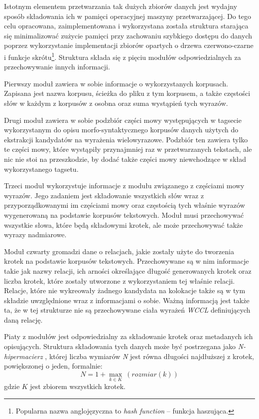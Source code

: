 \documentclass[11pt,a4paper]{llncs}
\begin{document}
Istotnym elementem przetwarzania tak dużych zbiorów danych jest wydajny sposób składowania ich w pamięci operacyjnej maszyny przetwarzającej.
Do tego celu opracowana, zaimplementowana i wykorzystana została struktura starająca się minimalizować zużycie pamięci przy zachowaniu szybkiego dostępu do danych poprzez wykorzystanie implementacji zbiorów opartych o drzewa czerwono-czarne i funkcje skrótu\footnote{Popularna nazwa anglojęzyczna to \emph{hash function} -- funkcja haszująca.}.
Struktura składa się z pięciu modułów odpowiedzialnych za przechowywanie innych informacji.


Pierwszy moduł zawiera w sobie informacje o wykorzystanych korpusach.
Zapisana jest nazwa korpusu, ścieżka do pliku z tym korpusem, a także częstości słów w każdym z korpusów z osobna oraz suma wystąpień tych wyrazów.


Drugi  moduł zawiera w sobie podzbiór części mowy występujących w tagsecie wykorzystanym do opisu morfo-syntaktycznego korpusów danych użytych do ekstrakcji kandydatów na wyrażenia wielowyrazowe.
Podzbiór ten zawiera tylko te części mowy, które wystąpiły przynajmniej raz w przetwarzanych tekstach, ale nic nie stoi na przeszkodzie, by dodać także części mowy niewchodzące w skład wykorzystanego tagsetu.


Trzeci moduł wykorzystuje informacje z modułu związanego z częściami mowy wyrazów. 
Jego zadaniem jest składowanie wszystkich słów wraz z przyporządkowanymi im częściami mowy oraz częstością tych właśnie wyrazów wygenerowaną na podstawie korpusów tekstowych.
Moduł musi przechowywać wszystkie słowa, które będą składowymi krotek, ale może przechowywać także wyrazy nadmiarowe.


Moduł czwarty gromadzi dane o relacjach, jakie zostały użyte do tworzenia krotek na podstawie korpusów tekstowych.
Przechowywane są w nim informacje takie jak nazwy relacji, ich arności określające długość generowanych krotek oraz liczba krotek, które zostały utworzone z wykorzystaniem tej właśnie relacji.
Relacje, które nie wykreowały żadnego kandydata na kolokacje także są w tym składzie uwzględnione wraz z informacjami o sobie.
Ważną informacją jest także ta, że w tej strukturze nie są przechowywane ciała wyrażeń \emph{WCCL} definiujących daną relację.

Piaty z modułów jest odpowiedzialny za składowanie krotek oraz metadanych ich opisujących.
Struktura składowania tych danych może być postrzegana jako \emph{N-hipermacierz} \cite[rozdział 15]{hypermat}, której liczba wymiarów \emph{N} jest równa długości najdłuższej z krotek, powiększonej o jeden, formalnie:
$$N=1+\max_{k \in K} \: (rozmiar(k))$$
gdzie $K$ jest zbiorem wszystkich krotek.
\end{document}
